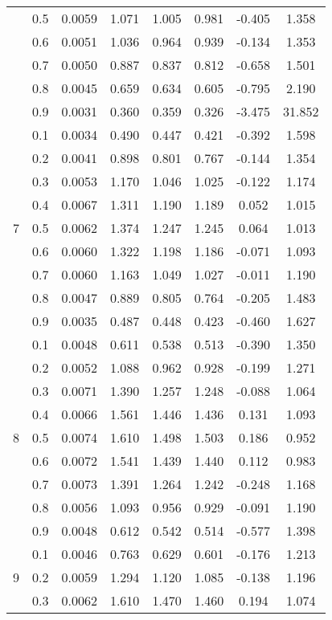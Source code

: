 \documentclass[11pt,a4paper]{report}
\begin{document}
\begin{longtable}{ | c | c || c | c | c | c | c | c | }
 & 0.5 & 0.0059 & 1.071 & 1.005 & 0.981 & -0.405 & 1.358 \\
 & 0.6 & 0.0051 & 1.036 & 0.964 & 0.939 & -0.134 & 1.353 \\
 & 0.7 & 0.0050 & 0.887 & 0.837 & 0.812 & -0.658 & 1.501 \\
 & 0.8 & 0.0045 & 0.659 & 0.634 & 0.605 & -0.795 & 2.190 \\
 & 0.9 & 0.0031 & 0.360 & 0.359 & 0.326 & -3.475 & 31.852 \\
 \hline
\multirow{9}{*}{7} & 0.1 & 0.0034 & 0.490 & 0.447 & 0.421 & -0.392 & 1.598 \\
 & 0.2 & 0.0041 & 0.898 & 0.801 & 0.767 & -0.144 & 1.354 \\
 & 0.3 & 0.0053 & 1.170 & 1.046 & 1.025 & -0.122 & 1.174 \\
 & 0.4 & 0.0067 & 1.311 & 1.190 & 1.189 & 0.052 & 1.015 \\
 & 0.5 & 0.0062 & 1.374 & 1.247 & 1.245 & 0.064 & 1.013 \\
 & 0.6 & 0.0060 & 1.322 & 1.198 & 1.186 & -0.071 & 1.093 \\
 & 0.7 & 0.0060 & 1.163 & 1.049 & 1.027 & -0.011 & 1.190 \\
 & 0.8 & 0.0047 & 0.889 & 0.805 & 0.764 & -0.205 & 1.483 \\
 & 0.9 & 0.0035 & 0.487 & 0.448 & 0.423 & -0.460 & 1.627 \\
 \hline
\multirow{9}{*}{8} & 0.1 & 0.0048 & 0.611 & 0.538 & 0.513 & -0.390 & 1.350 \\
 & 0.2 & 0.0052 & 1.088 & 0.962 & 0.928 & -0.199 & 1.271 \\
 & 0.3 & 0.0071 & 1.390 & 1.257 & 1.248 & -0.088 & 1.064 \\
 & 0.4 & 0.0066 & 1.561 & 1.446 & 1.436 & 0.131 & 1.093 \\
 & 0.5 & 0.0074 & 1.610 & 1.498 & 1.503 & 0.186 & 0.952 \\
 & 0.6 & 0.0072 & 1.541 & 1.439 & 1.440 & 0.112 & 0.983 \\
 & 0.7 & 0.0073 & 1.391 & 1.264 & 1.242 & -0.248 & 1.168 \\
 & 0.8 & 0.0056 & 1.093 & 0.956 & 0.929 & -0.091 & 1.190 \\
 & 0.9 & 0.0048 & 0.612 & 0.542 & 0.514 & -0.577 & 1.398 \\
 \hline
\multirow{9}{*}{9} & 0.1 & 0.0046 & 0.763 & 0.629 & 0.601 & -0.176 & 1.213 \\
 & 0.2 & 0.0059 & 1.294 & 1.120 & 1.085 & -0.138 & 1.196 \\
 & 0.3 & 0.0062 & 1.610 & 1.470 & 1.460 & 0.194 & 1.074 \\

\end{longtable}
\end{document}
